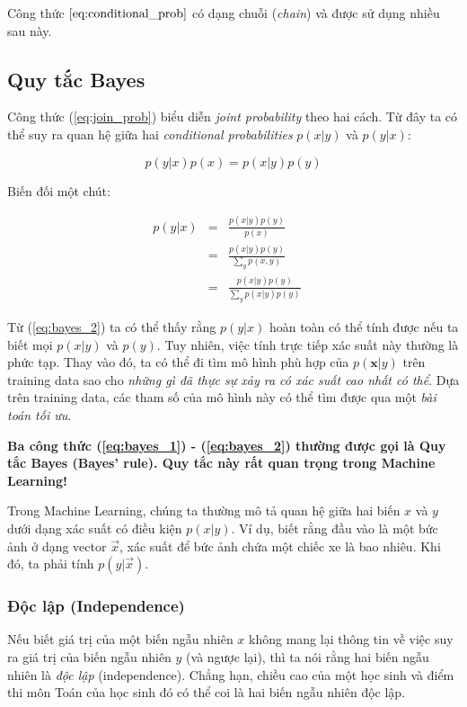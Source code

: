 \documentclass[../main-report.tex]{subfiles}
\begin{document}
Công thức \(\ref{eq:conditional_prob}\) có dạng chuỗi (\textit{chain}) và được sử dụng nhiều sau này.

\subsection{Quy tắc Bayes}
Công thức (\ref{eq:join_prob}) biểu diễn \textit{joint probability} theo hai cách. Từ đây ta có thể suy ra quan hệ giữa hai \textit{conditional probabilities} \(p(x |y)\) và \(p(y | x)\):

\[
  p(y | x) p(x) = p(x | y) p(y)
\]

Biến đối một chút:


\begin{eqnarray}
  p(y | x)
  & = & \frac{p(x | y) p(y)}{p(x)} \label{eq:bayes_1} \\
  & = & \frac{p(x | y) p(y)}{\sum_{y} p(x, y)} \\
  & = & \frac{p(x |y) p(y)}{\sum_{y} p(x | y) p(y)} \quad \label{eq:bayes_2}
\end{eqnarray}

Từ (\ref{eq:bayes_2}) ta có thể thấy rằng \(p(y | x)\) hoàn toàn có thể tính được nếu ta biết mọi \(p(x | y)\) và \(p(y)\). Tuy nhiên, việc tính trực tiếp xác suất này thường là phức tạp. Thay vào đó, ta có thể đi tìm mô hình phù hợp của \(p(\mathbf{x} | y)\) trên training data sao cho \textit{những gì đã thực sự xảy ra có xác suất cao nhất có thể}. Dựa trên training data, các tham số của mô hình này có thể tìm được qua một \textit{bài toán tối ưu}.

\textbf{Ba công thức (\ref{eq:bayes_1}) - (\ref{eq:bayes_2}) thường được gọi là Quy tắc Bayes (Bayes' rule). Quy tắc này rất quan trọng trong Machine Learning!}

Trong Machine Learning, chúng ta thường mô tả quan hệ giữa hai biến \(x\) và \(y\) dưới dạng xác suất có điều kiện \(p(x|y)\). Ví dụ, biết rằng đầu vào là một bức ảnh ở dạng vector \(\vec{x}\), xác suất để bức ảnh chứa một chiếc xe là bao nhiêu. Khi đó, ta phải tính \(p(y | \vec{x})\).

\subsubsection*{Độc lập (Independence)}
Nếu biết giá trị của một biến ngẫu nhiên \(x\) không mang lại thông tin về việc suy ra giá trị của biến ngẫu nhiên \(y\) (và ngược lại), thì ta nói rằng hai biến ngẫu nhiên là \emph{độc lập} (independence). Chẳng hạn, chiều cao của một học sinh và điểm thi môn Toán của học sinh đó có thể coi là hai biến ngẫu nhiên độc lập.
\end{document}
